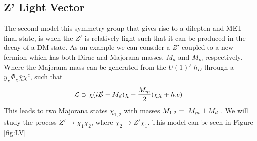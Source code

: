 \documentclass[12pt, a4paper]{book}
\begin{document}
\subsection{Z' Light Vector}
The second model this symmetry group that gives rise to a dilepton and MET final state, is when the $Z'$ is relatively light such that it can be produced in the decay of a DM state. As an example we can consider a $Z'$ 
coupled to a new fermion which has both Dirac and Majorana masses, $M_d$ and $M_m$ respectively. Where the Majorana mass can be generated from the $U(1)'$ $h_D$ through a $y_\chi\Phi_\chi\overline{\chi}\chi^c$, such that
$$
\mathcal{L}\supset \overline{\chi}(i\slashed{D}-M_d)\chi - \frac{M_m}{2}(\overline{\chi}\chi + h.c)
$$
This leads to two Majorana states $\chi_{1,2}$ with masses $M_{1,2}=\abs{M_m\pm M_d}$. We will study the process $Z'\rightarrow\chi_1\chi_2$, where $\chi_2\rightarrow Z'\chi_1$. This model can be seen in Figure \ref{fig:LV}
\end{document}
